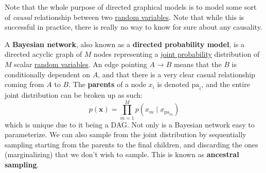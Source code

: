 \documentclass{article}
\begin{document}
  Note that the whole purpose of directed graphical models is to model some sort of \textit{causal} relationship between two \hyperref[prob-def:random-variable]{random variables}. Note that while this is successful in practice, there is really no way to know for sure about any causality. 

  \begin{definition}
    \label{def:bayesian-network}
  
    A \textbf{Bayesian network}, also known as a \textbf{directed probability model}, is a directed acyclic graph of $M$ nodes representing a \hyperref[prob-def:joint-probability-law]{joint probability} distribution of $M$ scalar \hyperref[prob-def:random-variable]{random variables}. An edge pointing $A \rightarrow B$ means that the $B$ is conditionally dependent on $A$, and that there is a very clear casual relationship coming from $A$ to $B$. The \textbf{parents} of a node $x_i$ is denoted $\mathrm{pa}_i$, and the entire joint distribution can be broken up as such: 
    \begin{equation}
      p(\mathbf{x}) = \prod_{m=1}^M p(x_m \mid x_{\mathrm{pa}_m})
    \end{equation}
    which is unique due to it being a DAG. Not only is a Bayesian network easy to parameterize. We can also sample from the joint distribution by sequentially sampling starting from the parents to the final children, and discarding the ones (marginalizing) that we don't wish to sample. This is known as \textbf{ancestral sampling}. 

    \begin{figure}[H]
      \centering 
      \caption{} 
      \label{fig:bayesian_network}
    \end{figure}
  \end{definition}
\end{document}
